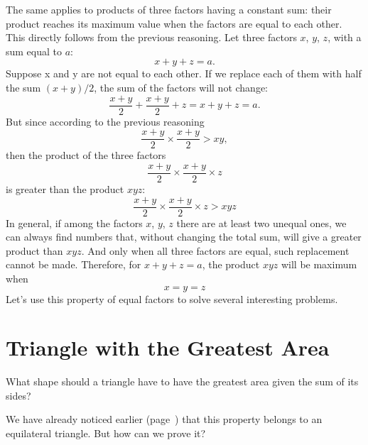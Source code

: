 The same applies to products of three factors having a constant sum: their product reaches its maximum value when the factors are equal to each other. This directly follows from the previous reasoning. Let three factors $x$, $y$, $z$, with a sum equal to $a$:
\begin{equation*}%
x + y + z = a.
\end{equation*}
Suppose x and y are not equal to each other. If we replace each of them with half the sum $(x + y) / 2$, the sum of the factors will not change:
\begin{equation*}%
\frac{x + y}{2} + \frac{x + y}{2} + z = x + y + z = a.
\end{equation*}
But since according to the previous reasoning
\begin{equation*}%
\frac{x + y}{2} \times\frac{x + y}{2} > xy,
\end{equation*}
then the product of the three factors
\begin{equation*}%
\frac{x + y}{2} \times\frac{x + y}{2} \times z
\end{equation*}
is greater than the product $xyz$:
\begin{equation*}%
\frac{x + y}{2} \times\frac{x + y}{2} \times z > xyz
\end{equation*}
In general, if among the factors $x$, $y$, $z$ there are at least two unequal ones, we can always find numbers that, without changing the total sum, will give a greater product than $xyz$. And only when all three factors are equal, such replacement cannot be made. Therefore, for $x + y + z = a$, the product $xyz$ will be maximum when
\begin{equation*}%
x = y = z
\end{equation*}
Let's use this property of equal factors to solve several interesting problems.

\section{Triangle with the Greatest Area}
\label{sec-12.10}



\ques What shape should a triangle have to have the greatest area given the sum of its sides?

We have already noticed earlier (page~\pageref{sec-12.2}) that this property belongs to an equilateral triangle. But how can we prove it?




